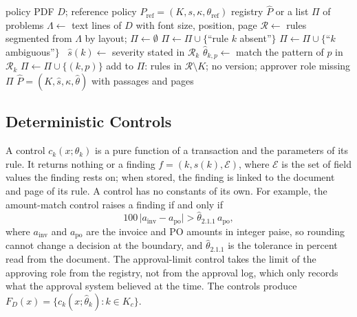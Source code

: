 \documentclass[9pt,a4paper,twocolumn]{extarticle}
\newcommand{\rp}{\hat{\theta}}
\begin{document}
\begin{algorithm}[t]
\caption{Policy compilation with refusal}
\label{alg:compile}
\fontsize{8}{9.5}\selectfont
\begin{algorithmic}[1]
\Require policy PDF $D$; reference policy $P_{\mathrm{ref}}=(K,s,\kappa,\theta_{\mathrm{ref}})$
\Ensure registry $\hat{P}$ or a list $\Pi$ of problems
\State $\Lambda\gets$ text lines of $D$ with font size, position, page
\State $\mathcal{R}\gets$ rules segmented from $\Lambda$ by layout; $\Pi\gets\emptyset$
   $\Pi\gets\Pi\cup\{$``rule $k$ absent''$\}$
   $\Pi\gets\Pi\cup\{$``$k$ ambiguous''$\}$
  \Else\ $\hat{s}(k)\gets$ severity stated in $\mathcal{R}_k$
      \State $\hat{\theta}_{k,p}\gets$ match the pattern of $p$ in $\mathcal{R}_k$
       $\Pi\gets\Pi\cup\{(k,p)\}$ \EndIf
    \EndFor
  \EndIf
\EndFor
\State add to $\Pi$: rules in $\mathcal{R}\setminus K$; no version; approver role missing
\If{$\Pi\neq\emptyset$} \Return $\Pi$  \EndIf
\State \Return $\hat{P}=(K,\hat{s},\kappa,\hat{\theta})$ with passages and pages
\end{algorithmic}
\end{algorithm}

\subsection{Deterministic Controls}
A control $c_k(x;\theta_k)$ is a pure function of a transaction and the parameters of its rule. It returns nothing or a finding $f=(k,s(k),\mathcal{E})$, where $\mathcal{E}$ is the set of field values the finding rests on; when stored, the finding is linked to the document and page of its rule. A control has no constants of its own. For example, the amount-match control raises a finding if and only if
\begin{equation}
100\,\lvert a_{\mathrm{inv}}-a_{\mathrm{po}}\rvert>\hat{\theta}_{2.1.1}\,a_{\mathrm{po}},
\label{eq:amount}
\end{equation}
where $a_{\mathrm{inv}}$ and $a_{\mathrm{po}}$ are the invoice and PO amounts in integer paise, so rounding cannot change a decision at the boundary, and $\hat{\theta}_{2.1.1}$ is the tolerance in percent read from the document. The approval-limit control takes the limit of the approving role from the registry, not from the approval log, which only records what the approval system believed at the time. The controls produce $F_D(x)=\{c_k(x;\rp_k):k\in K_c\}$.
\end{document}
